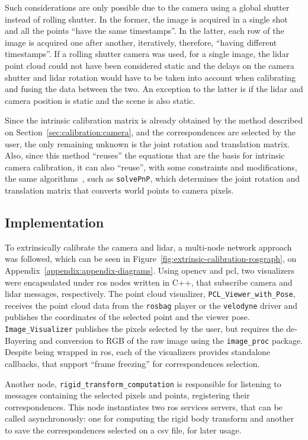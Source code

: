 Such considerations are only possible due to the camera using a global shutter instead of rolling shutter. In the former, the image is acquired in a single shot and all the points ``have the same timestamps''. In the latter, each row of the image is acquired one after another, iteratively, therefore, ``having different timestamps''. If a rolling shutter camera was used, for a single image, the \ac{lidar} point cloud could not have been considered static and the delays on the camera shutter and \ac{lidar} rotation would have to be taken into account when calibrating and fusing the data between the two. An exception to the latter is if the \ac{lidar} and camera position is static and the scene is also static.

Since the intrinsic calibration matrix is already obtained by the method described on Section~\ref{sec:calibration:camera}, and the correspondences are selected by the user, the only remaining unknown is the joint rotation and translation matrix. Also, since this method ``reuses'' the equations that are the basis for intrinsic camera calibration, it can also ``reuse'', with some constraints and modifications, the same algorithms~\cite{opencv_doc}, such as \texttt{solvePnP}, which determines the joint rotation and translation matrix that converts world points to camera pixels.


\subsection{Implementation}
To extrinsically calibrate the camera and \ac{lidar}, a multi-node network approach was followed, which can be seen in Figure~\ref{fig:extrinsic-calibration-rosgraph}, on Appendix~\ref{appendix:appendix-diagrams}. Using \ac{opencv} and \ac{pcl}, two visualizers were encapsulated under \ac{ros} nodes written in C++, that subscribe camera and \ac{lidar} messages, respectively. The point cloud visualizer, \texttt{PCL\_Viewer\_with\_Pose}, receives the point cloud data from the \texttt{rosbag} player or the \texttt{velodyne} driver and publishes the coordinates of the selected point and the viewer pose. \texttt{Image\_Visualizer} publishes the pixels selected by the user, but requires the de-Bayering and conversion to RGB of the raw image using the \texttt{image\_proc} package. Despite being wrapped in \ac{ros}, each of the visualizers provides standalone callbacks, that support ``frame freezing'' for correspondences selection.

Another node, \texttt{rigid\_transform\_computation} is responsible for listening to messages containing the selected pixels and points, registering their correspondences. This node  instantiates two \ac{ros} services servers, that can be called asynchronously: one for computing the rigid body transform and another to save the correspondences selected on a \ac{csv} file, for later usage. 

